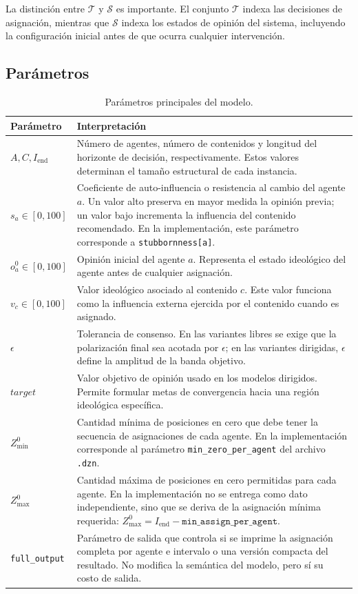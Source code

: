 \documentclass[10pt,letterpaper]{article}
\begin{document}
La distinci\'on entre \(\mathcal{T}\) y \(\mathcal{S}\) es importante. El conjunto \(\mathcal{T}\) indexa las decisiones de asignaci\'on, mientras que \(\mathcal{S}\) indexa los estados de opini\'on del sistema, incluyendo la configuraci\'on inicial antes de que ocurra cualquier intervenci\'on.

\subsection{Par\'ametros}

\begin{table}[H]
\centering
\caption{Par\'ametros principales del modelo.}
\begin{tabularx}{\linewidth}{lY}
\toprule
\textbf{Par\'ametro} & \textbf{Interpretaci\'on} \\
\midrule
\(A,C,I_{\text{end}}\) & N\'umero de agentes, n\'umero de contenidos y longitud del horizonte de decisi\'on, respectivamente. Estos valores determinan el tama\~no estructural de cada instancia. \\
\(s_a \in [0,100]\) & Coeficiente de auto-influencia o resistencia al cambio del agente \(a\). Un valor alto preserva en mayor medida la opini\'on previa; un valor bajo incrementa la influencia del contenido recomendado. En la implementaci\'on, este par\'ametro corresponde a \texttt{stubbornness[a]}. \\
\(o^0_a \in [0,100]\) & Opini\'on inicial del agente \(a\). Representa el estado ideol\'ogico del agente antes de cualquier asignaci\'on. \\
\(v_c \in [0,100]\) & Valor ideol\'ogico asociado al contenido \(c\). Este valor funciona como la influencia externa ejercida por el contenido cuando es asignado. \\
\(\epsilon\) & Tolerancia de consenso. En las variantes libres se exige que la polarizaci\'on final sea acotada por \(\epsilon\); en las variantes dirigidas, \(\epsilon\) define la amplitud de la banda objetivo. \\
\(target\) & Valor objetivo de opini\'on usado en los modelos dirigidos. Permite formular metas de convergencia hacia una regi\'on ideol\'ogica espec\'ifica. \\
\(Z^0_{\min}\) & Cantidad m\'inima de posiciones en cero que debe tener la secuencia de asignaciones de cada agente. En la implementaci\'on corresponde al par\'ametro \texttt{min\_zero\_per\_agent} del archivo \texttt{.dzn}. \\
\(Z^0_{\max}\) & Cantidad m\'axima de posiciones en cero permitidas para cada agente. En la implementaci\'on no se entrega como dato independiente, sino que se deriva de la asignaci\'on m\'inima requerida: \(Z^0_{\max}=I_{\text{end}}-\texttt{min\_assign\_per\_agent}\). \\
\texttt{full\_output} & Par\'ametro de salida que controla si se imprime la asignaci\'on completa por agente e intervalo o una versi\'on compacta del resultado. No modifica la sem\'antica del modelo, pero s\'i su costo de salida. \\
\bottomrule
\end{tabularx}
\end{table}
\end{document}
